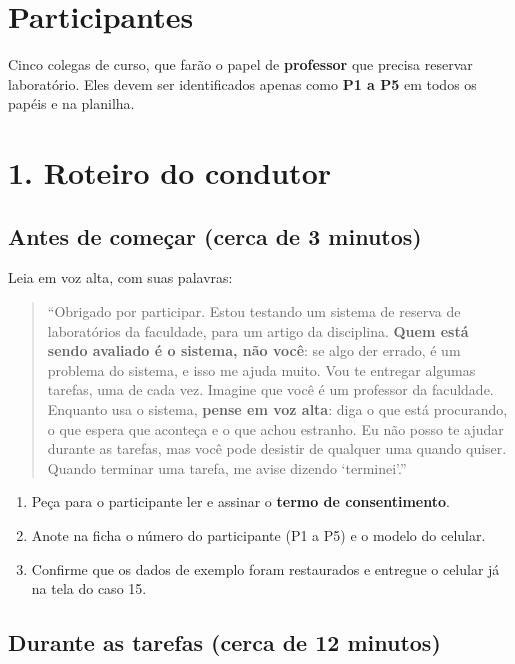 \documentclass[a4paper,12pt]{article}
\begin{document}
\section*{Participantes}

Cinco colegas de curso, que farão o papel de \textbf{professor} que
precisa reservar laboratório. Eles devem ser identificados apenas como
\textbf{P1 a P5} em todos os papéis e na planilha.

\newpage
\section*{1. Roteiro do condutor}

\subsection*{Antes de começar (cerca de 3 minutos)}

Leia em voz alta, com suas palavras:

\begin{quote}
``Obrigado por participar. Estou testando um sistema de reserva de
laboratórios da faculdade, para um artigo da disciplina. \textbf{Quem está
sendo avaliado é o sistema, não você}: se algo der errado, é um problema
do sistema, e isso me ajuda muito. Vou te entregar algumas tarefas, uma
de cada vez. Imagine que você é um professor da faculdade. Enquanto usa
o sistema, \textbf{pense em voz alta}: diga o que está procurando, o que
espera que aconteça e o que achou estranho. Eu não posso te ajudar
durante as tarefas, mas você pode desistir de qualquer uma quando
quiser. Quando terminar uma tarefa, me avise dizendo `terminei'.''
\end{quote}

\begin{enumerate}[leftmargin=1cm]
  \item Peça para o participante ler e assinar o \textbf{termo de consentimento}.
  \item Anote na ficha o número do participante (P1 a P5) e o modelo do celular.
  \item Confirme que os dados de exemplo foram restaurados e entregue o celular
    já na tela do caso 15.
\end{enumerate}

\subsection*{Durante as tarefas (cerca de 12 minutos)}
\end{document}
